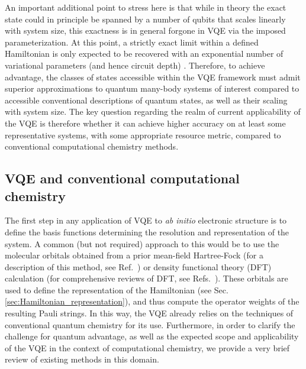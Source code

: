 An important additional point to stress here is that while in theory the exact state could in principle be spanned by a number of qubits that scales linearly with system size, this exactness is in general forgone in VQE via the imposed parameterization. At this point, a strictly exact limit within a defined Hamiltonian is only expected to be recovered with an exponential number of variational parameters (and hence circuit depth) \cite{Evangelista2019}. Therefore, to achieve advantage, the classes of states accessible within the VQE framework must admit superior approximations to quantum many-body systems of interest compared to accessible conventional descriptions of quantum states, as well as their scaling with system size. The key question regarding the realm of current applicability of the VQE is therefore whether it can achieve higher accuracy on at least some representative systems, with some appropriate resource metric, compared to conventional computational chemistry methods.

\subsection{VQE and conventional computational chemistry} \label{sec:vqe_vs_conventional}

The first step in any application of VQE to {\em ab initio} electronic structure is to define the basis functions determining the resolution and representation of the system. A common (but not required) approach to this would be to use the molecular orbitals obtained from a prior mean-field Hartree-Fock (for a description of this method, see  Ref.~\cite{Jensen2017}) or density functional theory (DFT) calculation \cite{Hohenberg1964, Levy1979, Vignale1987, Kohn1965} (for comprehensive reviews of DFT, see Refs.~\cite{Parr1995, Bagayoko2014}). These orbitals are used to define the representation of the Hamiltonian (see Sec. \ref{sec:Hamiltonian_representation}), and thus compute the operator weights of the resulting Pauli strings. In this way, the VQE already relies on the techniques of conventional quantum chemistry for its use. Furthermore, in order to clarify the challenge for quantum advantage, as well as the expected scope and applicability of the VQE in the context of computational chemistry, we provide a very brief review of existing methods in this domain.

